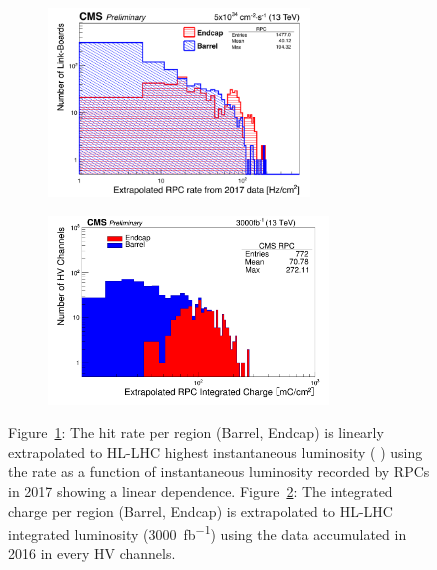 	\begin{figure}[H]
		\begin{subfigure}{0.5\linewidth}
			\centering
			\includegraphics[height=5cm]{fig/chapt5/RPC-Rate-HL-LHC_2017.png}
			\caption{\label{fig:RPC-HL-LHC:A}}
		\end{subfigure}
		\begin{subfigure}{0.5\linewidth}
			\centering
			\includegraphics[height=5cm]{fig/chapt5/RPC-IC-HL-LHC_2016.png}
			\caption{\label{fig:RPC-HL-LHC:B}}
		\end{subfigure}
		\caption{\label{fig:RPC-HL-LHC} Figure~\ref{fig:RPC-HL-LHC:A}: The hit rate per region (Barrel, Endcap) is linearly extrapolated to HL-LHC highest instantaneous luminosity ( \siflux) using the rate as a function of instantaneous luminosity recorded by RPCs in 2017 showing a linear dependence. Figure~\ref{fig:RPC-HL-LHC:B}: The integrated charge per region (Barrel, Endcap) is extrapolated to HL-LHC integrated luminosity (\SI{3000}{fb^{-1}}) using the data accumulated in 2016 in every HV channels.}
	\end{figure}
    
